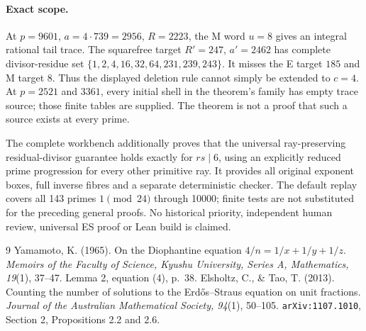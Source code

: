 \documentclass[11pt,reqno]{amsart}
\begin{document}
\paragraph{Exact scope.}
At $p=9601$, $a=4\cdot739=2956$, $R=2223$, the M word $u=8$ gives an integral
rational tail trace. The squarefree target $R'=247$, $a'=2462$ has complete
divisor-residue set $\{1,2,4,16,32,64,231,239,243\}$. It misses the E target
$185$ and M target $8$. Thus the displayed deletion rule cannot simply be
extended to $c=4$. At $p=2521$ and $3361$, every initial shell in the theorem's
family has empty trace source; those finite tables are supplied. The theorem
is not a proof that such a source exists at every prime.

The complete workbench additionally proves that the universal ray-preserving
residual-divisor guarantee holds exactly for $rs\mid6$, using an explicitly
reduced prime progression for every other primitive ray. It provides all
original exponent boxes, full inverse fibres and a separate deterministic
checker. The default replay covers all 143 primes $1\pmod{24}$ through 10000;
finite tests are not substituted for the preceding general proofs. No historical
priority, independent human review, universal ES proof or Lean build is claimed.

\begin{thebibliography}{9}
 Yamamoto, K. (1965). On the Diophantine equation
$4/n=1/x+1/y+1/z$. \emph{Memoirs of the Faculty of Science, Kyushu University,
Series A, Mathematics, 19}(1), 37--47. Lemma 2, equation (4), p.~38.
 Elsholtz, C., \& Tao, T. (2013). Counting the number of solutions
to the Erd\H{o}s--Straus equation on unit fractions.
\emph{Journal of the Australian Mathematical Society, 94}(1), 50--105.
\texttt{arXiv:1107.1010}, Section 2, Propositions 2.2 and 2.6.
\end{thebibliography}
\end{document}
